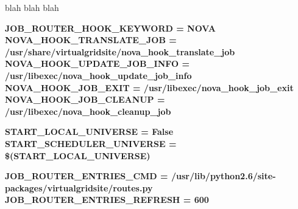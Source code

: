 \documentclass[a4paper]{jpconf}
\begin{document}
blah blah blah

\begin{center}
    \colorbox{htcondorbox}{
        \begin{minipage}{\textwidth}
        \small
            \bf{JOB\_ROUTER\_HOOK\_KEYWORD = NOVA \newline \newline
                NOVA\_HOOK\_TRANSLATE\_JOB = /usr/share/virtualgridsite/nova\_hook\_translate\_job \newline
                NOVA\_HOOK\_UPDATE\_JOB\_INFO = /usr/libexec/nova\_hook\_update\_job\_info \newline
                NOVA\_HOOK\_JOB\_EXIT = /usr/libexec/nova\_hook\_job\_exit \newline
                NOVA\_HOOK\_JOB\_CLEANUP = /usr/libexec/nova\_hook\_cleanup\_job
            }
        \end{minipage}
    }
\end{center}


\begin{center}
    \colorbox{htcondorbox}{
        \begin{minipage}{\textwidth}
        \small
            \bf{START\_LOCAL\_UNIVERSE = False  \newline
                START\_SCHEDULER\_UNIVERSE = \$(START\_LOCAL\_UNIVERSE)
            }
        \end{minipage}
    }
\end{center}



\begin{center}
    \colorbox{htcondorbox}{
        \begin{minipage}{\textwidth}
        \small
            \bf{JOB\_ROUTER\_ENTRIES\_CMD = \newline 
                \hspace*{1cm}/usr/lib/python2.6/site-packages/virtualgridsite/routes.py \newline
                JOB\_ROUTER\_ENTRIES\_REFRESH = 600
            }
        \end{minipage}
    }
\end{center}
\end{document}
